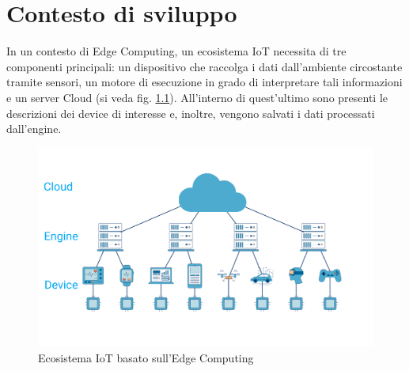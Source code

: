\chapter{Contesto di sviluppo}
In un contesto di Edge Computing, un ecosistema IoT necessita di tre componenti principali: un dispositivo che raccolga i dati dall'ambiente circostante tramite sensori, un motore di esecuzione in grado di interpretare tali informazioni e un server Cloud (si veda fig. \ref{ecosistema}). All'interno di quest'ultimo sono presenti le descrizioni dei device di interesse e, inoltre, vengono salvati i dati processati dall'engine.\\
\begin{figure}[H]
	\centering
	\includegraphics[width=\linewidth]{pics/edgecomputingstruct}
	\caption{Ecosistema IoT basato sull'Edge Computing}
	\label{ecosistema}
\end{figure}
\newpage
